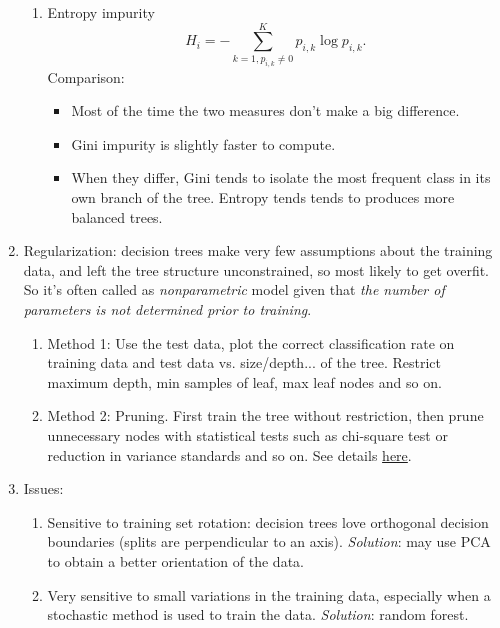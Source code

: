 \documentclass[12pt,oneside,a4paper]{article}
\numberwithin{equation}{section}
\begin{document}
\begin{enumerate}
\begin{enumerate}
\item Entropy impurity
\begin{equation}
H_i = - \sum_{k=1, p_{i, k} \neq 0}^{K} p_{i,k} \log p_{i,k}.
\end{equation}
Comparison:
\begin{itemize}
\item  Most of the time the two measures don't make a big difference. 
\item  Gini impurity is slightly faster to compute. 
\item When they differ, Gini tends to isolate the most frequent class in its own branch of the tree. Entropy tends tends to produces more balanced trees.
\end{itemize}
\end{enumerate}
\item Regularization: decision trees make very few assumptions about the training data, and left the tree structure unconstrained, so most likely to get overfit. So it's often called as \emph{nonparametric} model given that \emph{the number of parameters is not determined prior to training}.
\begin{enumerate}
\item Method 1: Use the test data, plot the correct classification rate on training data and test data vs. size/depth... of the tree. Restrict maximum depth, min samples of leaf, max leaf nodes and so on. 
\item Method 2: Pruning. First train the tree without restriction, then prune unnecessary nodes with statistical tests such as chi-square test or reduction in variance standards and so on. See details \href{https://medium.com/@rishabhjain_22692/decision-trees-it-begins-here-93ff54ef134}{here}.

\end{enumerate}
\item Issues:
\begin{enumerate}
\item Sensitive to training set rotation: decision trees love orthogonal decision boundaries (splits are perpendicular to an axis). \emph{Solution}: may use PCA to obtain a better orientation of the data. 

\item Very sensitive to small variations in the training data, especially when a stochastic method is used to train the data. \emph{Solution}: random forest.
\end{enumerate}
\end{enumerate}
\end{document}
